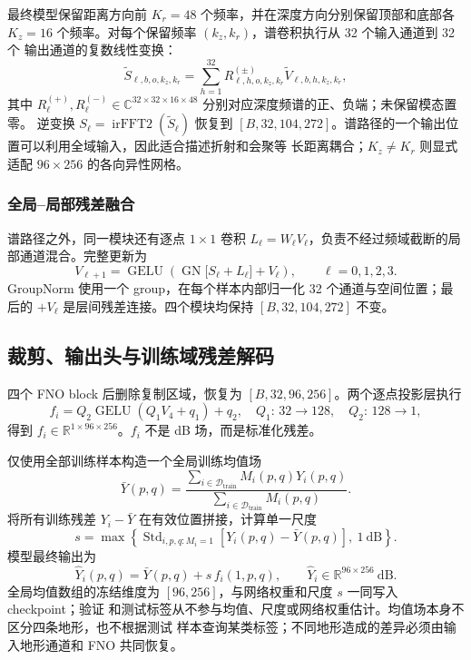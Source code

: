 \documentclass[UTF8,11pt]{ctexart}
\begin{document}
最终模型保留距离方向前 $K_r=48$ 个频率，并在深度方向分别保留顶部和底部各
$K_z=16$ 个频率。对每个保留频率 $(k_z,k_r)$，谱卷积执行从 32 个输入通道到 32 个
输出通道的复数线性变换：
\begin{equation}
  \widetilde S_{\ell,b,o,k_z,k_r}
  =\sum_{h=1}^{32}R^{(\pm)}_{\ell,h,o,k_z,k_r}
  \widetilde V_{\ell,b,h,k_z,k_r},
\end{equation}
其中 $R^{(+)}_\ell,R^{(-)}_\ell\in
\mathbb{C}^{32\times32\times16\times48}$ 分别对应深度频谱的正、负端；未保留模态置零。
逆变换
$S_\ell=\operatorname{irFFT2}(\widetilde S_\ell)$ 恢复到
$[B,32,104,272]$。谱路径的一个输出位置可以利用全域输入，因此适合描述折射和会聚等
长距离耦合；$K_z\ne K_r$ 则显式适配 $96\times256$ 的各向异性网格。

\subsubsection{全局--局部残差融合}

谱路径之外，同一模块还有逐点 $1\times1$ 卷积
$L_\ell=W_\ell V_\ell$，负责不经过频域截断的局部通道混合。完整更新为
\begin{equation}
  V_{\ell+1}=\operatorname{GELU}\!\left(
  \operatorname{GN}\big[S_\ell+L_\ell\big]+V_\ell\right),
  \qquad \ell=0,1,2,3.
\end{equation}
GroupNorm 使用一个 group，在每个样本内部归一化 32 个通道与空间位置；最后的
$+V_\ell$ 是层间残差连接。四个模块均保持 $[B,32,104,272]$ 不变。

\subsection{裁剪、输出头与训练域残差解码}

四个 FNO block 后删除复制区域，恢复为 $[B,32,96,256]$。两个逐点投影层执行
\begin{equation}
  f_i=Q_2\operatorname{GELU}(Q_1V_4+q_1)+q_2,
  \quad Q_1:\,32\rightarrow128,\quad Q_2:\,128\rightarrow1,
\end{equation}
得到 $f_i\in\mathbb{R}^{1\times96\times256}$。$f_i$ 不是 dB 场，而是标准化残差。

仅使用全部训练样本构造一个全局训练均值场
\begin{equation}
  \bar Y(p,q)=\frac{\sum_{i\in\mathcal{D}_{\mathrm{train}}}M_i(p,q)Y_i(p,q)}
  {\sum_{i\in\mathcal{D}_{\mathrm{train}}}M_i(p,q)}.
\end{equation}
将所有训练残差 $Y_i-\bar Y$ 在有效位置拼接，计算单一尺度
\begin{equation}
  s=\max\left\{\operatorname{Std}_{i,p,q:M_i=1}
  [Y_i(p,q)-\bar Y(p,q)],\ 1\ \mathrm{dB}\right\}.
\end{equation}
模型最终输出为
\begin{equation}
  \hat Y_i(p,q)=\bar Y(p,q)+s\,f_i(1,p,q),
  \qquad \hat Y_i\in\mathbb{R}^{96\times256}\ \mathrm{dB}.
\end{equation}
全局均值数组的冻结维度为 $[96,256]$，与网络权重和尺度 $s$ 一同写入 checkpoint；验证
和测试标签从不参与均值、尺度或网络权重估计。均值场本身不区分四条地形，也不根据测试
样本查询某类标签；不同地形造成的差异必须由输入地形通道和 FNO 共同恢复。
\end{document}
